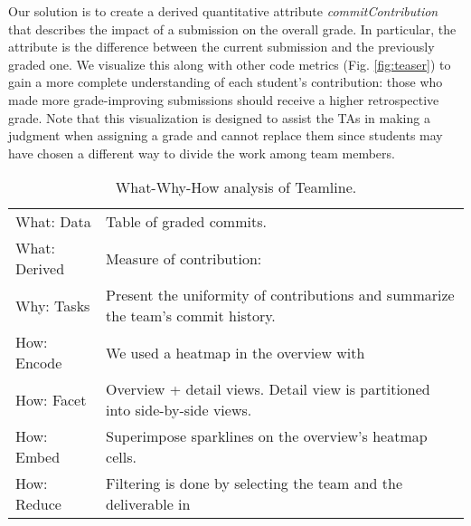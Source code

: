 \documentclass[../manifest.tex]{subfiles}
\begin{document}
Our solution is to create a derived quantitative attribute \textit{commitContribution} that describes
the impact of a submission on the overall grade. In particular, the attribute is
the difference between the current submission and the previously graded one. We
visualize this along with other code metrics (Fig. \ref{fig:teaser}) to gain a more
complete understanding of each student's contribution: those who made more grade-improving
submissions should receive a higher retrospective grade. Note that this visualization
is designed to assist the TAs in
making a judgment when assigning a grade and cannot replace them since students may
have chosen a different way to divide the work among team members.



\begin{table}
  \centering
  \label{tab:analysis}
  \caption{What-Why-How analysis of Teamline.}
  \begin{tabular}{ l | l }
    \hline
    What: Data & Table of graded commits. \\
    What: Derived & Measure of contribution:  \\
    Why: Tasks & Present the uniformity of contributions and summarize the team's commit history. \\
    How: Encode & We used a heatmap in the overview with  \\
    How: Facet & Overview + detail views. Detail view is partitioned into side-by-side views. \\
    How: Embed & Superimpose sparklines on the overview's heatmap cells. \\
    How: Reduce & Filtering is done by selecting the team and the deliverable in  \\
    \hline
  \end{tabular}
\end{table}
\end{document}
